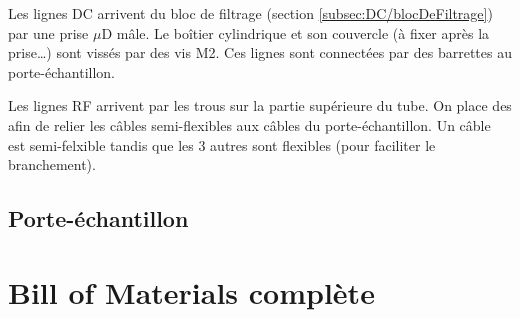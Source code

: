 \documentclass[a4paper,11pt]{article}
\newcommand{\uD}{$\mu$D }
\begin{document}
Les lignes DC arrivent du bloc de filtrage (section \ref{subsec:DC/blocDeFiltrage}) par une prise \uD mâle. Le boîtier cylindrique et son couvercle (à fixer après la prise…) sont vissés par des vis M2. Ces lignes sont connectées par des barrettes au porte-échantillon.\medskip

Les lignes RF arrivent par les trous sur la partie supérieure du tube. On place des 
afin de relier les câbles semi-flexibles aux câbles du porte-échantillon. Un câble est semi-felxible tandis que les 3 autres sont flexibles (pour faciliter le branchement).

\subsection{Porte-échantillon}


\section{Bill of Materials complète}

\end{document}
